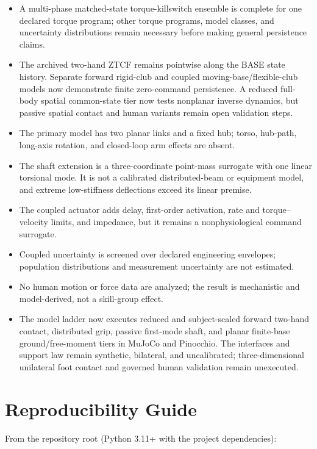 \documentclass[
  letterpaper,
]{report}
\providecommand{\tightlist}{%
  \setlength{\itemsep}{0pt}\setlength{\parskip}{0pt}}
\begin{document}
\begin{itemize}
\tightlist
\item
  A multi-phase matched-state torque-killswitch ensemble is complete for
  one declared torque program; other torque programs, model classes, and
  uncertainty distributions remain necessary before making general
  persistence claims.
\item
  The archived two-hand ZTCF remains pointwise along the BASE state
  history. Separate forward rigid-club and coupled
  moving-base/flexible-club models now demonstrate finite zero-command
  persistence. A reduced full-body spatial common-state tier now tests
  nonplanar inverse dynamics, but passive spatial contact and human
  variants remain open validation steps.
\item
  The primary model has two planar links and a fixed hub; torso,
  hub-path, long-axis rotation, and closed-loop arm effects are absent.
\item
  The shaft extension is a three-coordinate point-mass surrogate with
  one linear torsional mode. It is not a calibrated distributed-beam or
  equipment model, and extreme low-stiffness deflections exceed its
  linear premise.
\item
  The coupled actuator adds delay, first-order activation, rate and
  torque--velocity limits, and impedance, but it remains a
  nonphysiological command surrogate.
\item
  Coupled uncertainty is screened over declared engineering envelopes;
  population distributions and measurement uncertainty are not
  estimated.
\item
  No human motion or force data are analyzed; the result is mechanistic
  and model-derived, not a skill-group effect.
\item
  The model ladder now executes reduced and subject-scaled forward
  two-hand contact, distributed grip, passive first-mode shaft, and
  planar finite-base ground/free-moment tiers in MuJoCo and Pinocchio.
  The interfaces and support law remain synthetic, bilateral, and
  uncalibrated; three-dimensional unilateral foot contact and governed
  human validation remain unexecuted.
\end{itemize}

\chapter{Reproducibility Guide}\label{sec-appendix-repro}

From the repository root (Python 3.11+ with the project dependencies):
\end{document}
